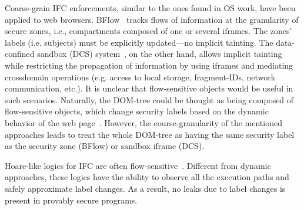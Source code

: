 Coarse-grain IFC enforcements, similar to the ones found in OS work, have been
applied to web browsers. BFlow~\citep{Yip:2009} tracks flows of information at
the granularity of secure zones, i.e., compartments composed of one or several
iframes. The zones' labels (i.e. subjects) must be explicitly updated---no
implicit tainting. The data-confined sandbox (DCS)
system~\citep{conf/esorics/AkhaweLHSS13}, on the other hand, allows implicit
tainting while restricting the propagation of information by using iframes and
mediating crossdomain operations (e.g. access to local storage, fragment-IDs,
network communication, etc.). It is unclear that flow-sensitive objects would be
useful in such scenarios. Naturally, the DOM-tree could be thought as being
composed of flow-sensitive objects, which change security labels based on the
dynamic behavior of the web page~\citep{Russo:2009}. However, the
course-granularity of the mentioned approaches leads to treat the whole DOM-tree
as having the same security label as the security zone (BFlow) or sandbox iframe
(DCS). 

Hoare-like logics for IFC are often
flow-sensitive~\citep[e.g.][]{Amtoft:2006,Nanevski:2011}. Different from dynamic
approaches, these logics have the ability to observe all the execution paths and
safely approximate label changes. As a result, no leaks due to label changes is
present in provably secure programs.





